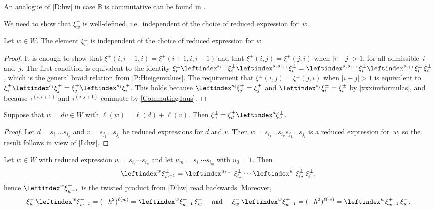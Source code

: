\documentclass[a4paper,11pt]{amsart}
\numberwithin{equation}{subsection}
\theoremstyle{definition}
\theoremstyle{theorem}
\theoremstyle{remark}
\newcommand\Sym{W}
\newcommand\xipm{\xi^\pm}
\newcommand\taui[1][i]{\tau^{(#1)}}
\newcommand{\Bo}{\mathbb{B}}
\begin{document}
An analogue of \autoref{D:hw} in case $\Bo$ is commutative can be found in
 \cite[Section~5.4]{LaiMinets}.

 We need to show that $\xi^\pm_w$ is well-defined, i.e.\ independent of the choice of reduced
 expression for~$w$.

 \begin{Lemma}\label{L:hw}
    Let $w\in W$. The element $\xi^\pm_w$ is independent of the choice of
    reduced expression for $w$.
 \end{Lemma}

 \begin{proof}
   It is enough to show that $\xi^\pm(i,i+1,i)=\xi^\pm(i+1,i,i+1)$ and that
   $\xi^\pm(i,j)=\xi^\pm(j,i)$ when $|i-j|>1$, for all admissible~$i$
   and~$j$. The first condition is equivalent to the identity
   $\xi_i^\pm\leftindex^{s_{i+1}}{{\xi_i^\pm}}\leftindex^{s_is_{i+1}}{{\xi_i^\pm}}
   =\leftindex^{s_is_{i+1}}{{\xi_i^\pm}}\leftindex^{s_{i+1}}{{\xi_i^\pm}}\,\xi_i^\pm$,
   which is the general braid relation from  \autoref{P:Hieigenvalues}.
    The requirement that
   $\xi^\pm(i,j)=\xi^\pm(j,i)$ when $|i-j|>1$ is equivalent to
   $\xipm_i\leftindex^{s_i}{{\xipm_j}}=\xipm_j\leftindex^{s_j}{{\xipm_i}}$. This holds because  $\leftindex^{s_i}{{\xipm_j}}=\xipm_j$ and $\leftindex^{s_j}{{\xipm_i}}=\xipm_i$ by \autoref{xxxinvformulas}, and because $\taui[i,i+1]$ and $\taui[j,j+1]$ commute by \autoref{CommutingTaus}.
 \end{proof}

 \begin{Corollary}\label{C:hdv}
     Suppose that $w=dv\in W$ with $\ell(w)=\ell(d)+\ell(v)$. Then
     $\xi^\pm_w=\xi^\pm_d\leftindex^d{{\xi^\pm_v}}$.
 \end{Corollary}

 \begin{proof}
     Let $d=s_{i_1}\dots s_{i_k}$ and $v=s_{j_1}\dots s_{j_l}$ be
     reduced expressions for $d$ and $v$. Then $w=s_{i_1}\dots
     s_{i_k}s_{j_1}\dots s_{j_l}$ is a reduced expression for~$w$, so
     the result follows in view of \autoref{L:hw}.
 \end{proof}

 \begin{Corollary}\label{C:hwrev}
  Let $w\in\Sym$ with reduced expression $w=s_{i_1}\cdots s_{i_k}$ and let
  $u_m=s_{i_1}\cdots s_{i_m}$ with $u_0=1$. Then
  \[\leftindex^w{{\xipm_{w^{-1}}}}
      =\leftindex^{u_{k-1}}{{\xipm_{i_k}}}\cdots
       \leftindex^{u_{1}}{{\xipm_{i_2}}}\;\xipm_{i_1},\]
 hence  $\leftindex^w{{\xipm_{w^{-1}}}}$ is the twisted product  from  \autoref{D:hw} read backwards. Moreover,
  \[\xi^+_w\,\leftindex^w{{\xi^-_{w^{-1}}}}=(-\hbar^2)^{\ell(w)}
      =\leftindex^w{{\xi^-_{w^{-1}}}}\,\xi^+_w\quad\text{ and }\quad
    \xi^-_w\,\leftindex^w{{\xi^+_{w^{-1}}}}=(-\hbar^2)^{\ell(w)}
      =\leftindex^w{{\xi^+_{w^{-1}}}}\,\xi^-_w.\]
\end{Corollary}
\end{document}
